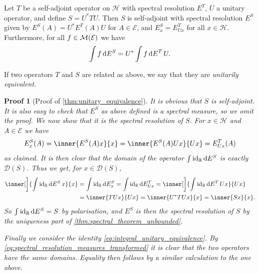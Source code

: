 \documentclass[article, a4paper, 11pt, oneside]{memoir}
\numberwithin{equation}{chapter}
\newcommand{\calH}{\mathcal{H}}
\newcommand{\calE}{\mathcal{E}}
\newcommand{\dom}{\mathcal{D}}
\theoremstyle{myexample}
\theoremstyle{myexample}
\theoremstyle{myexamplebreak}
\theoremstyle{myexamplebreak}
\theoremstyle{nonumberplain}
\theoremstyle{MyNonumberplain}
\newtheorem{proofof}{Proof}
\begin{document}
\begin{proposition}
    \label{thm:unitary_equivalence}
    Let $T$ be a self-adjoint operator on $\calH$ with spectral resolution $E^T$, $U$ a unitary operator, and define $S = U^*TU$. Then $S$ is self-adjoint with spectral resolution $E^S$ given by $E^S(A) = U^* E^T(A) U$ for $A \in \calE$, and $E^S_x = E^T_{Ux}$ for all $x \in \calH$. Furthermore, for all $f \in \measurable(\calE)$ we have
    \begin{equation}
        \label{eq:integral_unitary_equivalence}
        \int f \mathop{}\!\mathrm{d} E^S = U^* \int f \mathop{}\!\mathrm{d} E^T \, U.
    \end{equation}
\end{proposition}
%
If two operators $T$ and $S$ are related as above, we say that they are \emph{unitarily equivalent}.

\begin{proofof}[Proof of \cref{thm:unitary_equivalence}]
    It is obvious that $S$ is self-adjoint. It is also easy to check that $E^S$ as above defined is a spectral measure, so we omit the proof. We now show that it is the spectral resolution of $S$. For $x \in \calH$ and $A \in \calE$ we have
    \begin{equation}
        \label{eq:spectral_resolution_measures_transformed}
        E^S_x(A)
            = \inner{E^S(A)x}{x}
            = \inner{E^S(A)Ux}{Ux}
            = E^T_{Ux}(A)
    \end{equation}
    as claimed. It is then clear that the domain of the operator $\int \operatorname{id}_{\mathbb{R}} \mathop{}\!\mathrm{d} E^S$ is exactly $\dom(S)$. Thus we get, for $x \in \dom(S)$,
    \begin{align*}
        \inner[\bigg]{\int \id_\setR \dif E^S \, x}{x}
            &= \int \id_\setR \dif E^S_x
             = \int \id_\setR \dif E^T_{Ux}
             = \inner[\bigg]{\int \id_\setR \dif E^T \, Ux}{Ux} \\
            &= \inner{TUx}{Ux}
             = \inner{U^*TUx}{x}
             = \inner{Sx}{x}.
    \end{align*}
    So $\int \operatorname{id}_{\mathbb{R}} \mathop{}\!\mathrm{d} E^S = S$ by polarisation, and $E^S$ is then the spectral resolution of $S$ by the uniqueness part of \cref{thm:spectral_theorem_unbounded}.
    
    Finally we consider the identity \eqref{eq:integral_unitary_equivalence}. By \eqref{eq:spectral_resolution_measures_transformed} it is clear that the two operators have the same domains. Equality then follows by a similar calculation to the one above.
\end{proofof}
\end{document}
